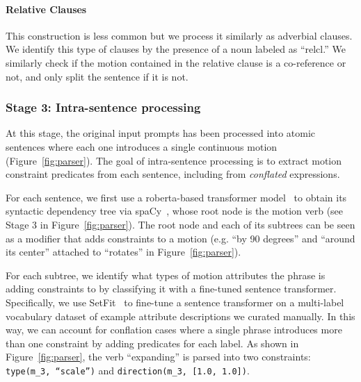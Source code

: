 \paragraph{Relative Clauses}
This construction is less common but we process it similarly as
adverbial clauses.  We identify this type of clauses by the presence
of a noun labeled as ``relcl.''
We similarly check if the motion
contained in the relative clause is a co-reference or not, and only
split the sentence if it is not. 


\subsubsection{Stage 3: Intra-sentence processing}
At this stage, the original input prompts has been processed into
atomic sentences where each one introduces a single continuous motion
(Figure~\ref{fig:parser}).  The goal of intra-sentence processing is to extract
motion constraint predicates from each sentence, including from
\textit{conflated} expressions. 

For each sentence, we first use a roberta-based transformer model~\cite{liu2019roberta}  to
obtain its syntactic dependency tree via
spaCy~\cite{honnibal2020spacy}, whose root node is the motion verb
(see Stage 3 in Figure~\ref{fig:parser}).
The root node and each of
its subtrees can be seen as a modifier that adds constraints to a
motion (e.g. ``by 90 degrees'' and ``around its center'' attached to
``rotates'' in Figure~\ref{fig:parser}). 

For each subtree, we identify what types of motion attributes the phrase is adding constraints to by classifying it with a fine-tuned sentence transformer. 
Specifically, we use SetFit~\cite{tunstall2022setfit} to fine-tune a sentence transformer on a multi-label vocabulary dataset of example attribute descriptions we curated manually. 
In this way, we can account for conflation cases where a single phrase
introduces more than one constraint by adding predicates for each
label.  As shown in Figure~\ref{fig:parser}, the verb ``expanding'' is
parsed into two constraints: \texttt{type(m\_3, ``scale'')} and
\texttt{direction(m\_3, [1.0, 1.0])}.

